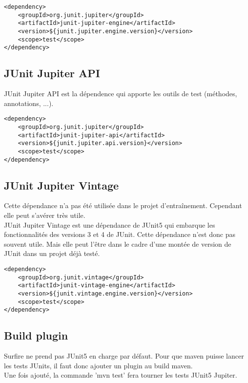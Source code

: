 \documentclass[12pt]{article}		%
\begin{document}
\lstset{language=XML, numbers=left}
\begin{lstlisting}[basicstyle=\small]
<dependency>
    <groupId>org.junit.jupiter</groupId>
    <artifactId>junit-jupiter-engine</artifactId>
    <version>${junit.jupiter.engine.version}</version>
    <scope>test</scope>
</dependency>
\end{lstlisting}

\subsection{JUnit Jupiter API}

JUnit Jupiter API est la dépendence qui apporte les outils de test (méthodes, annotations, ...).

\lstset{language=XML, numbers=left}
\begin{lstlisting}[basicstyle=\small]
<dependency>
    <groupId>org.junit.jupiter</groupId>
    <artifactId>junit-jupiter-api</artifactId>
    <version>${junit.jupiter.api.version}</version>
    <scope>test</scope>
</dependency>
\end{lstlisting}

\subsection{JUnit Jupiter Vintage}

Cette dépendance n'a pas été utilisée dans le projet d'entraînement. Cependant elle peut s'avérer très utile. \\ JUnit Jupiter Vintage est une dépendance de JUnit5 qui embarque les fonctionnalités des versions 3 et 4 de JUnit. Cette dépendance n'est donc pas souvent utile. Mais elle peut l'être dans le cadre d'une montée de version de JUnit dans un projet déjà testé.

\lstset{language=XML, numbers=left}
\begin{lstlisting}[basicstyle=\small]
<dependency>
    <groupId>org.junit.vintage</groupId>
    <artifactId>junit-vintage-engine</artifactId>
    <version>${junit.vintage.engine.version}</version>
    <scope>test</scope>
</dependency>
\end{lstlisting}

\subsection{Build plugin}

Surfire ne prend pas JUnit5 en charge par défaut. Pour que maven puisse lancer les tests JUnits, il faut donc ajouter un plugin au build maven. \\ Une fois ajouté, la commande 'mvn test' fera tourner les tests JUnit5 Jupiter.
\end{document}

